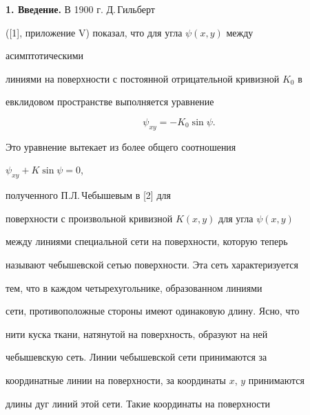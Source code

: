 

\pagestyle{plain} %


 




\maketitle 


\label{begin} 


 


{\bf 1. Введение.} В 1900 г. Д.\,Гильберт 


([1], приложение V) показал, что для угла $\psi(x,y)$ между 


асимптотическими 


линиями на поверхности с постоянной отрицательной кривизной $K_0$ в 


евклидовом пространстве выполняется уравнение 


\begin{equation} 


\psi_{x y}=-K_0\sin\psi. 


\end{equation} 


Это уравнение вытекает из более общего соотношения 


$\psi_{xy}+K\sin\psi=0$, 


полученного П.Л.\,Че\-бы\-ше\-вым в [2] для 


поверхности с произвольной кривизной $K(x,y)$ для угла $\psi(x,y)$ 


между линиями специальной сети на поверхности, которую теперь 


называют чебышевской сетью поверхности. Эта сеть характеризуется 


тем, что в каждом четырехугольнике, образованном линиями 


сети, противоположные стороны имеют одинаковую длину. Ясно, что 


нити куска ткани, натянутой на поверхность, образуют на ней 


чебышевскую сеть. Линии чебышевской сети принимаются за 


координатные линии на поверхности, за координаты $x$, $y$ принимаются 


длины дуг линий этой сети. Такие координаты на поверхности 


